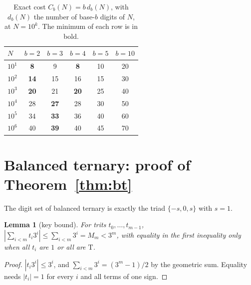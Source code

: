 \documentclass[11pt]{article}
\newtheorem{lemma}[theorem]{Lemma}
\theoremstyle{definition}\newtheorem{definition}[theorem]{Definition}
\theoremstyle{remark}\newtheorem{remark}[theorem]{Remark}
\newcommand{\T}{\mathrm{T}}
\begin{document}
\begin{table}[t]
\centering\small
\caption{Exact cost $C_b(N)=b\,d_b(N)$, with $d_b(N)$ the number of base-$b$ digits of $N$, at $N=10^k$. The minimum of each row is in bold.}\label{tab:finite}
\begin{tabular}{@{}lccccc@{}}
\toprule
$N$ & $b=2$ & $b=3$ & $b=4$ & $b=5$ & $b=10$\\
\midrule
$10^1$ & \textbf{8} & 9 & \textbf{8} & 10 & 20\\
$10^2$ & \textbf{14} & 15 & 16 & 15 & 30\\
$10^3$ & \textbf{20} & 21 & \textbf{20} & 25 & 40\\
$10^4$ & 28 & \textbf{27} & 28 & 30 & 50\\
$10^5$ & 34 & \textbf{33} & 36 & 40 & 60\\
$10^6$ & 40 & \textbf{39} & 40 & 45 & 70\\
\bottomrule
\end{tabular}
\end{table}

\section{Balanced ternary: proof of \texorpdfstring{Theorem~\ref{thm:bt}}{Theorem 1.2}}\label{sec:bt}
The digit set of balanced ternary is exactly the triad $\{-s,0,s\}$ with $s=1$.

\begin{lemma}[key bound]\label{lem:key}
For trits $t_0,\dots,t_{m-1}$, $|\sum_{i<m}t_i3^i|\le\sum_{i<m}3^i=M_m<3^m$, with equality in the first inequality only when all $t_i$ are $1$ or all are $\T$.
\end{lemma}
\begin{proof}
$|t_i3^i|\le3^i$, and $\sum_{i<m}3^i=(3^m-1)/2$ by the geometric sum. Equality needs $|t_i|=1$ for every $i$ and all terms of one sign.
\end{proof}
\end{document}
